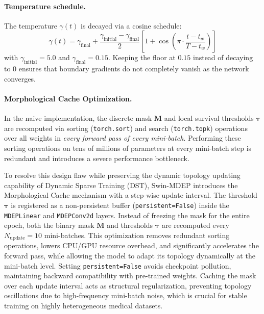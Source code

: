 \documentclass[letterpaper]{article} %
\begin{document}
\paragraph{Temperature schedule.}
The temperature $\gamma(t)$ is decayed via a cosine schedule:
\begin{equation}\label{eq:gamma_schedule}
    \gamma(t) = \gamma_{\text{final}} + \frac{\gamma_{\text{initial}} - \gamma_{\text{final}}}{2}\left[1 + \cos\!\left(\pi \cdot \frac{t - t_w}{T - t_w}\right)\right]
\end{equation}
with $\gamma_{\text{initial}} = 5.0$ and $\gamma_{\text{final}} = 0.15$. Keeping the floor at $0.15$ instead of decaying to $0$ ensures that boundary gradients do not completely vanish as the network converges.

\paragraph{Morphological Cache Optimization.}
In the naive implementation, the discrete mask $\bm{M}$ and local survival thresholds $\bm{\tau}$ are recomputed via sorting (\texttt{torch.sort}) and search (\texttt{torch.topk}) operations over all weights in \emph{every forward pass of every mini-batch}. Performing these sorting operations on tens of millions of parameters at every mini-batch step is redundant and introduces a severe performance bottleneck.

To resolve this design flaw while preserving the dynamic topology updating capability of Dynamic Sparse Training (DST), Swin-MDEP introduces the Morphological Cache mechanism with a step-wise update interval. The threshold $\bm{\tau}$ is registered as a non-persistent buffer (\texttt{persistent=False}) inside the \texttt{MDEPLinear} and \texttt{MDEPConv2d} layers. Instead of freezing the mask for the entire epoch, both the binary mask $\bm{M}$ and thresholds $\bm{\tau}$ are recomputed every $N_{\text{update}} = 10$ mini-batches. This optimization removes redundant sorting operations, lowers CPU/GPU resource overhead, and significantly accelerates the forward pass, while allowing the model to adapt its topology dynamically at the mini-batch level. Setting \texttt{persistent=False} avoids checkpoint pollution, maintaining backward compatibility with pre-trained weights. Caching the mask over each update interval acts as structural regularization, preventing topology oscillations due to high-frequency mini-batch noise, which is crucial for stable training on highly heterogeneous medical datasets.
\end{document}
